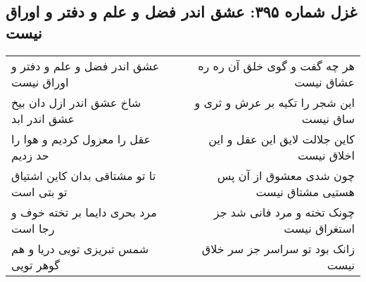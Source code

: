\begin{center}
\section*{غزل شماره ۳۹۵: عشق اندر فضل و علم و دفتر و اوراق نیست}
\label{sec:0395}
\begin{longtable}{l p{0.5cm} r}
عشق اندر فضل و علم و دفتر و اوراق نیست
&&
هر چه گفت و گوی خلق آن ره ره عشاق نیست
\\
شاخ عشق اندر ازل دان بیخ عشق اندر ابد
&&
این شجر را تکیه بر عرش و ثری و ساق نیست
\\
عقل را معزول کردیم و هوا را حد زدیم
&&
کاین جلالت لایق این عقل و این اخلاق نیست
\\
تا تو مشتاقی بدان کاین اشتیاق تو بتی است
&&
چون شدی معشوق از آن پس هستیی مشتاق نیست
\\
مرد بحری دایما بر تخته خوف و رجا است
&&
چونک تخته و مرد فانی شد جز استغراق نیست
\\
شمس تبریزی تویی دریا و هم گوهر تویی
&&
زانک بود تو سراسر جز سر خلاق نیست
\\
\end{longtable}
\end{center}
